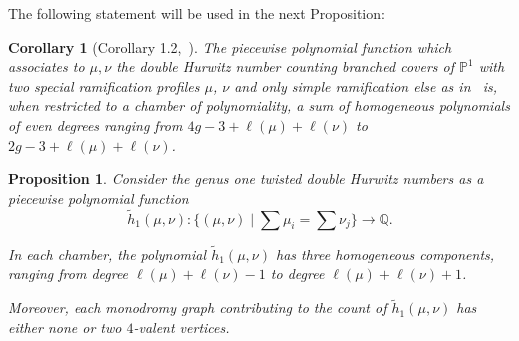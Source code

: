 \documentclass[10pt]{amsart}
\theoremstyle{plain}
\newtheorem{coro}[coro]{Corollary}
\theoremstyle{definition}
\theoremstyle{definition}
\theoremstyle{plain}
\theoremstyle{plain}
\newtheorem{prop}[prop]{Proposition}
\theoremstyle{remark}
\theoremstyle{plain}
\theoremstyle{plain}
\begin{document}
 
The following statement will be used in the next Proposition:
\begin{coro}[Corollary 1.2,~\cite{Joh15}]\label{cor-joh}
  The piecewise polynomial function which associates to $\mu,\nu$ the double Hurwitz number counting branched covers of $\mathbb{P}^1$ with two special ramification profiles $\mu$, $\nu$ and only simple ramification else as in~\cite{GJV05, CJM11} is, when restricted to a chamber of polynomiality, a sum of homogeneous polynomials of even degrees ranging from $ 4g-3+\ell(\mu)+\ell(\nu)$ to $2g-3+\ell(\mu)+\ell(\nu)$.
\end{coro}
 
  \begin{prop}\label{prop-ppingenus1}
 Consider the genus one twisted double Hurwitz numbers as a piecewise polynomial function 
$$\tilde{h}_1(\mu,\nu):\Big\{(\mu,\nu) \mid \sum \mu_i=\sum\nu_j\Big\} \longrightarrow\mathbb{Q}.$$ 

In each chamber, the polynomial $\tilde{h}_1(\mu,\nu)$ has three homogeneous components, ranging from degree $\ell(\mu)+\ell(\nu)-1$ to degree $\ell(\mu)+\ell(\nu)+1$.

Moreover, each monodromy graph contributing to the count of  $\tilde{h}_1(\mu,\nu)$ has either none or two $4$-valent vertices.
 \end{prop}
 
\end{document}
